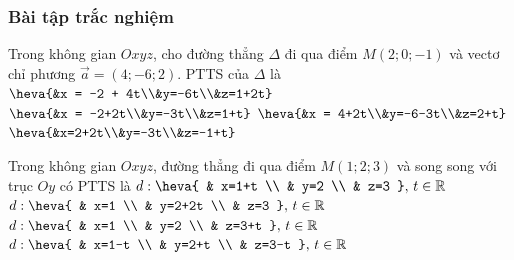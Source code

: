 \subsubsection{Bài tập trắc nghiệm}
	\begin{ex}%
	Trong không gian $Oxyz$, cho đường thẳng $\Delta$ đi qua điểm $M(2; 0; -1)$ và vectơ chỉ phương $\overrightarrow{a} = (4; -6; 2)$. PTTS của $\Delta$ là
	\choice
	{$\heva{&x = -2 + 4t\\&y=-6t\\&z=1+2t}$}
	{$\heva{&x = -2+2t\\&y=-3t\\&z=1+t}$}
	{$\heva{&x = 4+2t\\&y=-6-3t\\&z=2+t}$}
	{\True $\heva{&x=2+2t\\&y=-3t\\&z=-1+t}$}
	\end{ex}
\begin{ex}%
	Trong không gian $Oxyz$, đường thẳng đi qua điểm $M(1;2;3)$ và song song với trục $Oy$ có PTTS là
	\choice
	{$d: \heva{
	& x=1+t \\ 
	& y=2 \\ 
	& z=3
	},\, t\in\mathbb{R}$} 
	{\True $d: \heva{
	& x=1 \\ 
	& y=2+2t \\ 
	& z=3
	},\, t\in\mathbb{R}$} 
	{$d: \heva{
	& x=1 \\ 
	& y=2 \\ 
	& z=3+t
	},\, t\in\mathbb{R}$} 
	{$d: \heva{
	& x=1-t \\ 
	& y=2+t \\ 
	& z=3-t
	} ,\, t\in\mathbb{R}$}
\end{ex}
